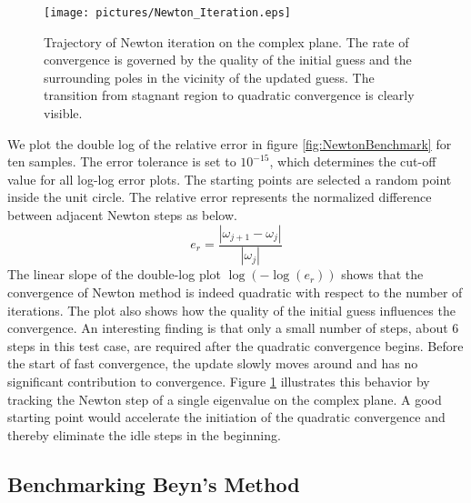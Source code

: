 \documentclass[final,leqno,onefignum,onetabnum]{siamltex1213}
\begin{document}
\begin{figure}\label{fig:NewtonIterate}
\begin{center}
\texttt{[image: pictures/Newton\_Iteration.eps]}
\end{center}
\caption{Trajectory of Newton iteration on the complex plane. \textnormal{The rate of convergence is governed by the quality of the initial guess and the surrounding poles in the vicinity of the updated guess. The transition from stagnant region to quadratic convergence is clearly visible.}} 
\end{figure}
We plot the double log of the relative error in figure \ref{fig:NewtonBenchmark} for ten samples. The error tolerance is set to $10^{-15}$, which determines the cut-off value for all log-log error plots. The starting points are selected a random point inside the unit circle. The relative error represents the normalized difference between adjacent Newton steps as below.
\begin{equation}\label{eq:er}
e_r=\frac{|\omega_{j+1} - \omega_j|}{|\omega_j|}
\end{equation}
The linear slope of the double-log plot $\log(-\log(e_r))$ shows that the convergence of Newton method is indeed quadratic with respect to the number of iterations. The plot also shows how the quality of the initial guess influences the convergence. An interesting finding is that only a small number of steps, about 6 steps in this test case, are required after the quadratic convergence begins. Before the start of fast convergence, the update slowly moves around and has no significant contribution to convergence. Figure \ref{fig:NewtonIterate} illustrates this behavior by tracking the Newton step of a single eigenvalue on the complex plane. A good starting point would accelerate the initiation of the quadratic convergence and thereby eliminate the idle steps in the beginning. 

\subsection{Benchmarking Beyn's Method}
\end{document}
